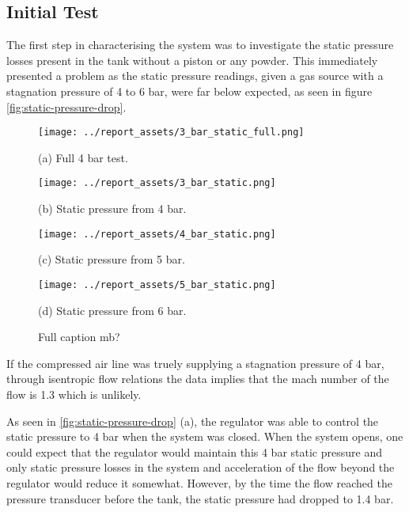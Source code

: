 \subsection{Initial Test}
The first step in characterising the system was to investigate the static pressure losses present in the tank without a piston or any powder. This immediately presented a problem as the static pressure readings, given a gas source with a stagnation pressure of 4 to 6 bar, were far below expected, as seen in figure \autoref{fig:static-pressure-drop}. 
\begin{figure}[htbp]
    \centering

    \begin{minipage}{0.45\textwidth}
        \centering
        \texttt{[image: ../report\_assets/3\_bar\_static\_full.png]}
        \caption*{(a) Full 4 bar test.}
    \end{minipage}    
    \hfill
    \begin{minipage}{0.45\textwidth}
        \centering
        \texttt{[image: ../report\_assets/3\_bar\_static.png]}
        \caption*{(b) Static pressure from 4 bar.}
    \end{minipage}    
    \begin{minipage}{0.45\textwidth}
        \centering
        \texttt{[image: ../report\_assets/4\_bar\_static.png]}
        \caption*{(c) Static pressure from 5 bar.}
    \end{minipage}    
    \hfill
    \begin{minipage}{0.45\textwidth}
        \centering
        \texttt{[image: ../report\_assets/5\_bar\_static.png]}
        \caption*{(d) Static pressure from 6 bar.}
    \end{minipage}    

    \caption{Full caption mb?}\label{fig:static-pressure-drop}
\end{figure}    
If the compressed air line was truely supplying a stagnation pressure of 4 bar, through isentropic flow relations the data implies that the mach number of the flow is 1.3 which is unlikely.

As seen in \autoref{fig:static-pressure-drop} (a), the regulator was able to control the static pressure to 4 bar when the system was closed. When the system opens, one could expect that the regulator would maintain this 4 bar static pressure and only static pressure losses in the system and acceleration of the flow beyond the regulator would reduce it somewhat. However, by the time the flow reached the pressure transducer before the tank, the static pressure had dropped to 1.4 bar. 

